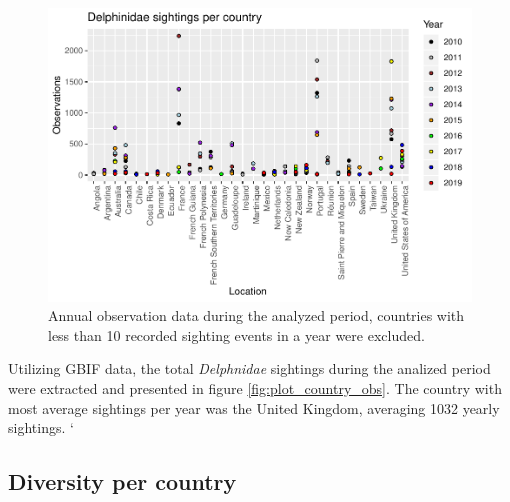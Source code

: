 \documentclass[10pt,letterpaper]{article}
\begin{document}
\begin{figure}

{\centering \includegraphics[width=1\linewidth]{SubjectEvaluation_3R_article_files/figure-latex/unnamed-chunk-4-1} 

}

\caption{\label{fig:plot_country_obs} Annual observation data during the analyzed period, countries with less than 10 recorded sighting events in a year were excluded.}\label{fig:unnamed-chunk-4}
\end{figure}

Utilizing GBIF data, the total \emph{Delphnidae} sightings during the
analized period were extracted and presented in figure
\ref{fig:plot_country_obs}. The country with most average sightings per
year was the United Kingdom, averaging 1032 yearly sightings. `

\hypertarget{diversity-per-country}{%
\subsection{Diversity per country}\label{diversity-per-country}}
\end{document}
